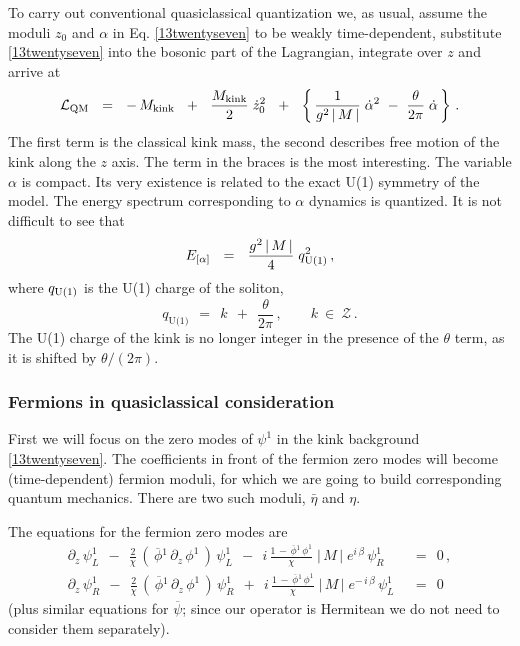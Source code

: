 \documentclass[epsfig,12pt]{article}
\def\beq{\begin{equation}}
\def\eeq{\end{equation}}
\def\beq{\begin{equation}}
\def\eeq{\end{equation}}
\newcommand{\p}{\partial}
\newcommand{\ov}{\overline}
\newcommand{\mc}[1]{\mathcal{#1}}
\newcommand{\bpsi}{\ov{\psi}{}}
\newcommand{\bphi}{\ov{\phi}{}}
\begin{document}
	To carry out  conventional
	quasiclassical quantization we, as usual,
	assume the moduli $ z_0 $ and $ \alpha $ in Eq. \eqref{13twentyseven}
	to be weakly time-dependent, substitute \eqref{13twentyseven}
	into the bosonic part of the Lagrangian, integrate over $ z $
	and arrive at
\beq
{\cal L}_{\rm QM}  ~~=~~  -\,M_{\rm kink}  ~~+~~  \frac{M_{\rm kink}}{2}\; \dot z_0^2 ~~+~~  
			\left\{\,
				\frac{1}{g^2\,|\, M \,|}\; \dot\alpha^2  ~-~
				\frac{\theta}{2\pi}\;\dot\alpha
			\,\right\}\,.
\label{13twentynine}
\eeq
	The first term is the classical kink mass, the second describes
	free motion of the kink along the $z$ axis.
	The term in the braces is the most interesting.
	The variable $ \alpha $ is compact.
	Its very existence is related to the exact U(1) symmetry of the model.
	The energy spectrum corresponding
	to $ \alpha $ dynamics is quantized.
	It is not difficult to see that
\beq
E_{[\alpha ]}  ~~=~~ \frac{g^2\, |\, M \,|}{4}\; q_{\rm U(1)}^2\,,
\label{13thirty}
\eeq
	where 
$ q_{\rm U(1)} $ 
	is the U(1) charge of the soliton,
\beq
	q_\text{U(1)} ~~=~~ k ~~+~~ \frac{\theta}{2\pi}\,,\qquad k ~\in~ \mc{Z}\,.
\label{13thirtyone}
\eeq
	The U(1) charge of the kink is no longer integer
	in the presence of the $\theta$ term, as it is shifted by $\theta/(2\pi )$.


\subsubsection{Fermions in quasiclassical consideration}

	First we will  focus on the 
	zero modes of $\psi^1$ in the kink background \eqref{13twentyseven}.
	The coefficients
	in front of the fermion zero modes will become (time-dependent)
	 fermion moduli, for which we are going to build
	corresponding quantum mechanics. 
	There are two such moduli, $\bar\eta$ and $\eta$.

	The equations for the fermion zero modes are
\begin{align}
	\p_z\,\psi_L^1  ~~-~~  
	\frac{2}{\chi}\, 
	\left(\, \bphi^1\, \p_z\, \phi^1 \,\right) \,\psi_L^1  ~~-~~
	i\,\frac{1 \,-\, \bphi^1\, \phi^1}{\chi}\; |\, M \,|\; e^{i\, \beta} \,\psi_R^1
	&  ~~=~~  0\,,
\nonumber
	\\[3mm]
	\p_z\,\psi_R^1  ~~-~~  
	\frac{2}{\chi}\, 
	\left(\, \bphi^1\, \p_z\, \phi^1 \,\right) \,\psi_R^1  ~~+~~  
	i\,\frac{1 \,-\, \bphi^1\, \phi^1}{\chi}\; |\, M \,|\; e^{-\, i\, \beta} \,\psi_L^1
	&  ~~=~~  0
\label{13fourtyfour}
\end{align}
	(plus similar equations for $\bpsi$; since our operator is 
	Hermitean we do not need to consider them separately).
\end{document}
